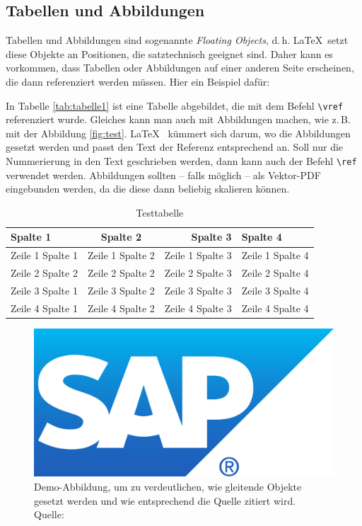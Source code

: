 \subsection{Tabellen und Abbildungen}
Tabellen und Abbildungen sind sogenannte \textit{Floating Objects}, d.\,h. \LaTeX\ setzt diese Objekte an Positionen, die satztechnisch geeignet sind. Daher kann es vorkommen, dass Tabellen oder Abbildungen auf einer anderen Seite erscheinen, die dann referenziert werden müssen. Hier ein Beispiel dafür: 

In Tabelle \vref{tab:tabelle1} ist eine Tabelle abgebildet, die mit dem Befehl \texttt{\textbackslash vref} referenziert wurde. Gleiches kann man auch mit Abbildungen 
machen, wie z.\,B. mit der Abbildung \vref{fig:test}. \LaTeX~ kümmert sich darum, wo die Abbildungen gesetzt werden und passt den Text der Referenz entsprechend an. Soll nur die Nummerierung in den Text geschrieben werden, dann kann auch der Befehl \texttt{\textbackslash ref} verwendet werden.
Abbildungen sollten -- falls möglich -- als Vektor-PDF eingebunden 
werden, da die diese dann beliebig skalieren können.

\lipsum[1]
\begin{table}
	\centering
	\begin{tabular}{p{3cm}crl}
		\textbf{Spalte 1} & \textbf{Spalte 2} & \textbf{Spalte 3} & \textbf{Spalte 4}\\\toprule
		Zeile 1 Spalte 1 &  Zeile 1 Spalte 2 & Zeile 1 Spalte 3 & Zeile 1 Spalte 4\\
		Zeile 2 Spalte 2 &  Zeile 2 Spalte 2 & Zeile 2 Spalte 3 & Zeile 2 Spalte 4\\\midrule
		Zeile 3 Spalte 1 &  Zeile 3 Spalte 2 & Zeile 3 Spalte 3 & Zeile 3 Spalte 4\\
		Zeile 4 Spalte 1 &  Zeile 4 Spalte 2 & Zeile 4 Spalte 3 & Zeile 4 Spalte 4\\\bottomrule
	\end{tabular}
	\caption[Testtabelle]{\label{tab:tabelle1}Testtabelle}
\end{table}
\lipsum[1-2]

\begin{figure}
	\centering 
	\includegraphics{img/firmenlogo.jpg}
	\captionsetup{format=hang}
	\caption[Optionaler Kurztitel für das Abbildunggsverzeichnis]{\label{fig:test}Demo-Abbildung, um zu verdeutlichen, wie gleitende Objekte gesetzt werden und wie entsprechend die Quelle zitiert wird. \\Quelle: \cite[][S. 223]{TD15}}
\end{figure}

